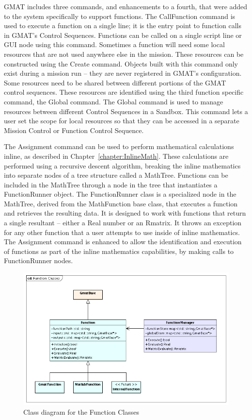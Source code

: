 GMAT includes three commands, and enhancements to a fourth, that were added to the system
specifically to support functions.  The CallFunction command is used to execute a function on a
single line; it is the entry point to function calls in GMAT's Control Sequences. Functions can be
called on a single script line or GUI node using this command.  Sometimes a function will need some
local resources that are not used anywhere else in the mission.  These resources can be constructed
using the Create command.  Objects built with this command only exist during a mission run -- they
are never registered in GMAT's configuration.  Some resources need to be shared between different
portions of the GMAT control sequences.  These resources are identified using the third function
specific command, the Global command.  The Global command is used to manage resources between
different Control Sequences in a Sandbox.  This command lets a user set the scope for local
resources so that they can be accessed in a separate Mission Control or Function Control Sequence.

The Assignment command can be used to perform mathematical calculations inline, as described in
Chapter~\ref{chapter:InlineMath}.  These calculations are performed using a recursive descent
algorithm, breaking the inline mathematics into separate nodes of a tree structure called a
MathTree.  Functions can be included in the MathTree through a node in the tree that instantiates
a FunctionRunner object.  The FunctionRunner class is a specialized node in the MathTree, derived
from the MathFunction base class, that executes a function and retrieves the resulting data.  It is
designed to work with functions that return a single resultant -- either a Real number or an
Rmatrix.  It throws an exception for any other function that a user attempts to use inside of
inline mathematics.  The Assignment command is enhanced to allow the identification and execution
of functions as part of the inline mathematics capabilities, by making calls to FunctionRunner
nodes.

\begin{figure}[htb]
\begin{center}
\includegraphics[350,225]{Images/FunctionClasses.png}
\caption{\label{figure:FunctionClassHierarchy}Class diagram for the Function Classes}
\end{center}
\end{figure}

